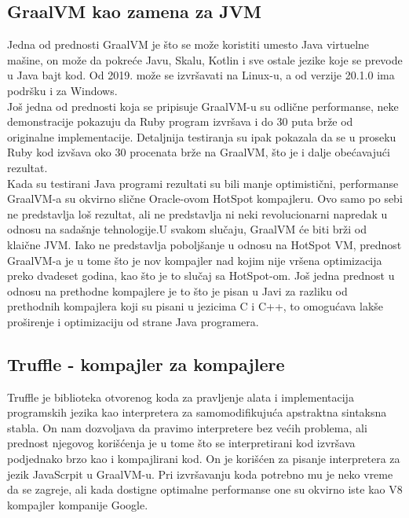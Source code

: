 \documentclass[a4paper]{article}
\begin{document}
\subsection{GraalVM kao zamena za JVM}
\label{sub:GraalVM kao zamena za JVM}

Jedna od prednosti GraalVM je što se može koristiti umesto Java virtuelne mašine, on može da pokreće Javu, Skalu, Kotlin i sve ostale jezike koje se prevode u Java bajt kod. Od 2019. može se izvršavati na Linux-u, a od verzije 20.1.0 ima podršku i za Windows. \\

Još jedna od prednosti koja se pripisuje GraalVM-u su odlične performanse, neke demonstracije pokazuju da Ruby program izvršava i do 30 puta brže od originalne implementacije.
Detaljnija testiranja su ipak pokazala da se u proseku Ruby kod izvšava oko 30 procenata brže na GraalVM, što je i dalje obećavajući rezultat. \\

Kada su testirani Java programi rezultati su bili manje optimistični, performanse GraalVM-a su okvirno slične Oracle-ovom HotSpot kompajleru. Ovo samo po sebi ne predstavlja loš rezultat, ali ne predstavlja ni neki revolucionarni napredak u odnosu na sadašnje tehnologije.U svakom slučaju, GraalVM će biti brži od klaične JVM. Iako ne predstavlja poboljšanje u odnosu na HotSpot VM, prednost GraalVM-a je u tome što je nov kompajler nad kojim nije vršena optimizacija preko dvadeset godina, kao što je to slučaj sa HotSpot-om. Još jedna prednost u odnosu na prethodne kompajlere je to što je pisan u Javi za razliku od prethodnih kompajlera koji su pisani u jezicima C i C++, to omogućava lakše proširenje i optimizaciju od strane Java programera.

\subsection{Truffle - kompajler za kompajlere}
\label{Truffle - kompajler za kompajlere}

Truffle je biblioteka otvorenog koda za pravljenje alata i implementacija programskih jezika kao interpretera za samomodifikujuća apstraktna sintaksna stabla. On nam dozvoljava 
da pravimo interpretere bez većih problema, ali prednost njegovog korišćenja je u tome što se interpretirani kod izvršava podjednako brzo kao i kompajlirani kod.
On je korišćen za pisanje interpretera za jezik JavaScrpit u GraalVM-u. Pri izvršavanju koda potrebno mu je neko vreme da se zagreje, ali kada dostigne optimalne performanse
one su okvirno iste kao V8 kompajler kompanije Google. \\
\end{document}
